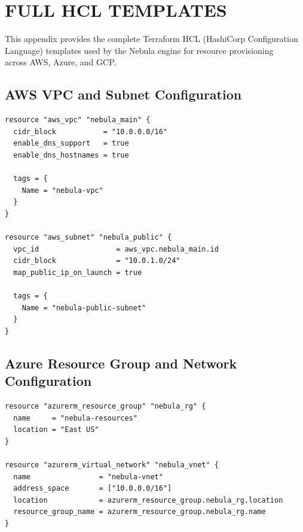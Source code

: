 \chapter{FULL HCL TEMPLATES}

This appendix provides the complete Terraform HCL (HashiCorp Configuration Language) templates used by the Nebula engine for resource provisioning \\ across AWS, Azure, and GCP.

\section{AWS VPC and Subnet Configuration}
\begin{lstlisting}[language=XML, caption=AWS Infrastructure (vpc.tf)]
resource "aws_vpc" "nebula_main" {
  cidr_block           = "10.0.0.0/16"
  enable_dns_support   = true
  enable_dns_hostnames = true
  
  tags = {
    Name = "nebula-vpc"
  }
}

resource "aws_subnet" "nebula_public" {
  vpc_id                  = aws_vpc.nebula_main.id
  cidr_block              = "10.0.1.0/24"
  map_public_ip_on_launch = true
  
  tags = {
    Name = "nebula-public-subnet"
  }
}
\end{lstlisting}

\section{Azure Resource Group and Network Configuration}
\begin{lstlisting}[language=XML, caption=Azure Infrastructure (network.tf)]
resource "azurerm_resource_group" "nebula_rg" {
  name     = "nebula-resources"
  location = "East US"
}

resource "azurerm_virtual_network" "nebula_vnet" {
  name                = "nebula-vnet"
  address_space       = ["10.0.0.0/16"]
  location            = azurerm_resource_group.nebula_rg.location
  resource_group_name = azurerm_resource_group.nebula_rg.name
}
\end{lstlisting}

